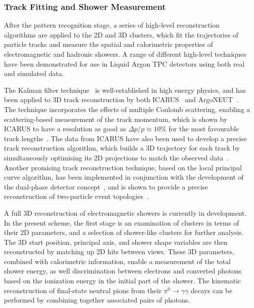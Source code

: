 \subsubsection{Track Fitting and Shower Measurement}


After the pattern recognition stage, a series of high-level reconstruction
algorithms are applied to the 2D and 3D clusters,
which fit the trajectories of particle tracks and measure the
spatial and calorimetric properties of electromagnetic and hadronic showers.
A range of different high-level techniques have been demonstrated 
for use in Liquid Argon TPC detectors using both real and simulated data.

The Kalman filter technique~\cite{kalman} is well-established in high energy physics,
and has been applied to 3D track reconstruction by both ICARUS~\cite{REF1} and ArgoNEUT~\cite{REF2}.
The technique incorporates the effects of multiple Coulomb scattering,
enabling a scattering-based measurement of the track momentum,
which is shown by ICARUS to have a resolution as good as $\Delta p/p \approx 10\%$ 
for the most favourable track lengths~\cite{REF3}.
The data from ICARUS have also been used to develop a precise
track reconstruction algorithm, which builds a 3D trajectory for each track by simultaneously
optimising its 2D projections to match the observed data~\cite{Antonello:2012hu}.
Another promising track reconstruction technique, based on the local principal curve algorithm,
has been implemented in conjunction with the development of the 
dual-phase detector concept~\cite{LAGUNA-LBNO-deliv}, and is shown to provide 
a precise reconstruction of two-particle event topologies~\cite{REF5}. 

A full 3D reconstruction of electromagnetic showers is currently in development.
In the present scheme, the first stage is an examination of clusters 
in terms of their 2D parameters, and a selection of shower-like clusters 
for further analysis. The 3D start position, principal axis,
and shower shape variables are then reconstructed by matching up 2D hits between views.
These 3D parameters, combined with calorimetric information, enable a measurement
of the total shower energy, as well discrimination between electrons
and converted photons based on the ionization energy in the initial part of
the shower. The kinematic reconstruction of final-state neutral pions from their
$\pi^{0} \rightarrow \gamma\gamma$ decays can be performed by 
combining together associated pairs of photons.


